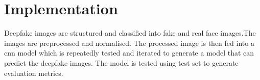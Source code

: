         \section{Implementation}
        Deepfake images are structured and classified into fake and real face images.The images are preprocessed and normalised. The processed image is then fed into a \acrfull*{cnn} model which is repeatedly tested and iterated to generate a model that can predict the deepfake images. The model is tested using test set to generate evaluation metrics.
        \vspace{0.5in}
        \begin{figure}[hbt!]
        \end{figure}

